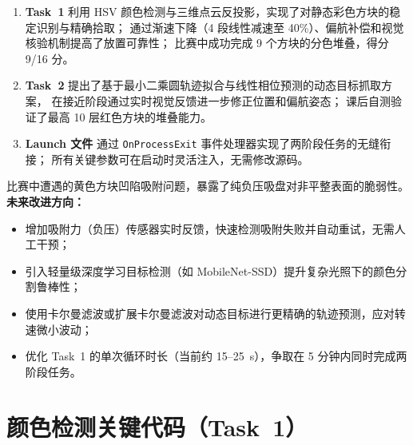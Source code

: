 \documentclass[12pt,a4paper]{article}
\begin{document}
\begin{enumerate}[noitemsep]
  \item \textbf{Task~1} 利用 HSV 颜色检测与三维点云反投影，实现了对静态彩色方块的稳定识别与精确拾取；
        通过渐速下降（4 段线性减速至 40\%）、偏航补偿和视觉核验机制提高了放置可靠性；
        比赛中成功完成 9 个方块的分色堆叠，得分 9/16 分。

  \item \textbf{Task~2} 提出了基于最小二乘圆轨迹拟合与线性相位预测的动态目标抓取方案，
        在接近阶段通过实时视觉反馈进一步修正位置和偏航姿态；
        课后自测验证了最高 10 层红色方块的堆叠能力。

  \item \textbf{Launch 文件} 通过 \texttt{OnProcessExit} 事件处理器实现了两阶段任务的无缝衔接；
        所有关键参数可在启动时灵活注入，无需修改源码。
\end{enumerate}

比赛中遭遇的黄色方块凹陷吸附问题，暴露了纯负压吸盘对非平整表面的脆弱性。
\textbf{未来改进方向：}
\begin{itemize}[noitemsep]
  \item 增加吸附力（负压）传感器实时反馈，快速检测吸附失败并自动重试，无需人工干预；
  \item 引入轻量级深度学习目标检测（如 MobileNet-SSD）提升复杂光照下的颜色分割鲁棒性；
  \item 使用卡尔曼滤波或扩展卡尔曼滤波对动态目标进行更精确的轨迹预测，应对转速微小波动；
  \item 优化 Task~1 的单次循环时长（当前约 15--25~s），争取在 5 分钟内同时完成两阶段任务。
\end{itemize}

\appendix

\section{颜色检测关键代码（Task~1）}
\label{app:color_detect}
\end{document}
